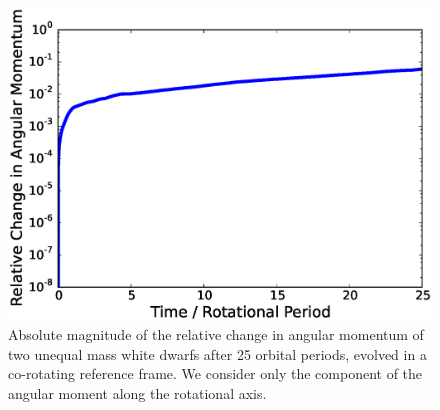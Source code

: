 \documentclass[12pt]{article}
\begin{document}
\begin{figure}[h!]
  \centering
  \includegraphics[scale=0.8,trim=0.1in 0.0in 0.1in 0.1in,clip]{plots/unequal_angular_momentum_rot1}
  \caption[System angular momentum over 25 orbital periods]
          {Absolute magnitude of the relative change in angular momentum of two unequal mass white dwarfs after 25 orbital periods, 
           evolved in a co-rotating reference frame. We consider only the component of the angular moment along the rotational 
           axis.
           \label{fig:angular_momentum_conservation_unequal}}
\end{figure}
\end{document}
